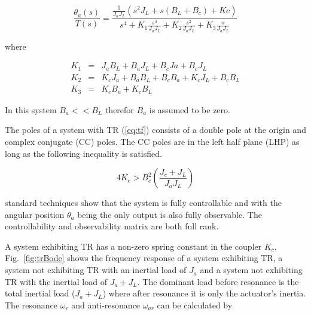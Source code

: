 

\begin{equation}\label{eq:tf}
\frac{\theta_a(s)}{T(s)} = \frac{\frac{1}{J_aJ_L}(s^2J_L+s(B_L+B_c)+Kc)}{s^4 + K_1\frac{s^3}{J_aJ_L} + K_2\frac{s^2}{J_aJ_L} + K_3\frac{s}{J_aJ_L}}
\end{equation}

where


\begin{eqnarray}
K_1 & =& J_aB_L+B_aJ_L+B_cJa+B_cJ_L \\
K_2 & =& K_cJ_a + B_aB_L +B_cB_a +K_cJ_L +B_cB_L \\
K_3 & =& K_cB_a+K_cB_L
\end{eqnarray}


In this system $B_a << B_L$ therefor $B_a$ is assumed to be zero.









The poles of a system with TR (\ref{eq:tf}) consists of a double pole at the origin and complex conjugate (CC) poles.  The CC poles are in the left half plane (LHP) as long as the following inequality is satisfied.

\begin{equation}
4K_c > B_c^2 \left( \frac{J_c+J_L}{J_aJ_L} \right)
\end{equation}





\noindent standard techniques show that the system is fully controllable and with the angular position $\theta_a$ being the only output is also fully observable.  The controllability and observability matrix are both full rank.



A system exhibiting TR has a non-zero spring constant in the coupler $K_c$.  Fig.~\ref{fig:trBode} shows the frequency response of a system exhibiting TR, a system not exhibiting TR with an inertial load of $J_a$ and a system not exhibiting TR with the inertial load of $J_a+J_L$.  The dominant load before resonance is the total inertial load ($J_a+J_L$) where after resonance it is only the actuator's inertia.  The resonance $\omega_r$ and anti-resonance $\omega_{ar}$ can be calculated by


